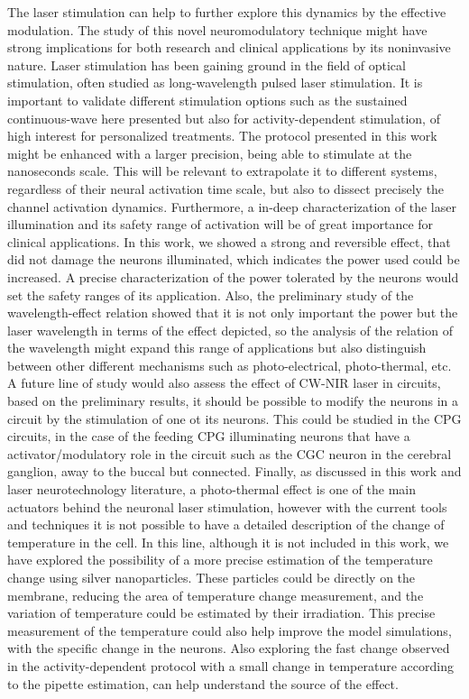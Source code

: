 The laser stimulation can help to further explore this dynamics by the effective modulation. The study of this novel neuromodulatory technique might have strong implications for both research and clinical applications by its noninvasive nature. Laser stimulation has been gaining ground in the field of optical stimulation, often studied as long-wavelength pulsed laser stimulation. It is important to validate different stimulation options such as the sustained continuous-wave here presented but also for activity-dependent stimulation, of high interest for personalized treatments. The protocol presented in this work might be enhanced with a larger precision, being able to stimulate at the nanoseconds scale. This will be relevant to extrapolate it to different systems, regardless of their neural activation time scale, but also to dissect precisely the channel activation dynamics. Furthermore, a in-deep characterization of the laser illumination and its safety range of activation will be of great importance for clinical applications. In this work, we showed a strong and reversible effect, that did not damage the neurons illuminated, which indicates the power used could be increased. A precise characterization of the power tolerated by the neurons would set the safety ranges of its application. Also, the preliminary study of the wavelength-effect relation showed that it is not only important the power but the laser wavelength in terms of the effect depicted, so the analysis of the relation of the wavelength might expand this range of applications but also distinguish between other different mechanisms such as photo-electrical, photo-thermal, etc. A future line of study would also assess the effect of CW-NIR laser in circuits, based on the preliminary results, it should be possible to modify the neurons in a circuit by the stimulation of one ot its neurons. This could be studied in the CPG circuits, in the case of the feeding CPG illuminating neurons that have a activator/modulatory role in the circuit such as the CGC neuron in the cerebral ganglion, away to the buccal but connected. Finally, as discussed in this work and laser neurotechnology literature, a photo-thermal effect is one of the main actuators behind the neuronal laser stimulation, however with the current tools and techniques it is not possible to have a detailed description of the change of temperature in the cell. In this line, although it is not included in this work, we have explored the possibility of a more precise estimation of the temperature change using silver nanoparticles. These particles could be directly on the membrane, reducing the area of temperature change measurement, and the variation of temperature could be estimated by their irradiation. This precise measurement of the temperature could also help improve the model simulations, with the specific change in the neurons. Also exploring the fast change observed in the activity-dependent protocol with a small change in temperature according to the pipette estimation, can help understand the source of the effect.

